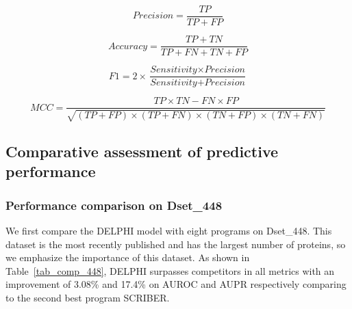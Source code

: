 \documentclass{bioinfo}
\begin{document}
\begin{equation}
\textit{Precision} = \frac{TP}{TP + FP} 
\end{equation}

\begin{equation}
\textit{Accuracy}=\frac{TP+TN}{TP+FN+TN+FP}
\end{equation}

\begin{equation}
F1=2\times \frac{\textit{Sensitivity}\times \textit{Precision}}{\textit{Sensitivity}+\textit{Precision}}
\end{equation}

\begin{equation}
MCC\!=\!\frac{TP \times TN - FN \times FP}{\sqrt{(TP\!+\!FP)\!\times\! (TP\!+\!FN)\! \times \!(TN\!+\!FP)\!\times\!(TN\!+\!FN)}}
\end{equation}

\subsection{Comparative assessment of predictive performance}
\subsubsection{Performance comparison on Dset\_448}
We first compare the DELPHI model with eight programs on Dset\_448. This dataset is the most recently published and has the largest number of proteins, so we emphasize the importance of this dataset. As shown in Table~\ref{tab_comp_448}, DELPHI surpasses competitors in all metrics with an improvement of 3.08\% and 17.4\% on AUROC and AUPR respectively comparing to the second best program SCRIBER.
\end{document}
